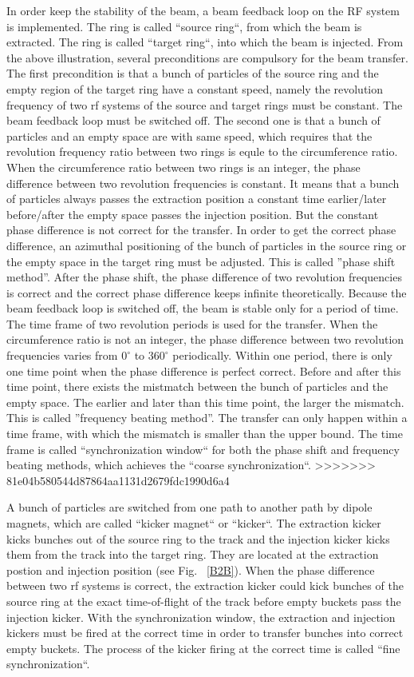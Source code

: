 In order keep the stability of the beam, a beam feedback loop on the RF system is implemented. The ring is called ``source ring``, from which the beam is extracted. The ring is called ``target ring``, into which the beam is injected. From the above illustration, several preconditions are compulsory for the beam transfer. The first precondition is that a bunch of particles of the source ring and the empty region of the target ring have a constant speed, namely the revolution frequency of two rf systems of the source and target rings must be constant. The beam feedback loop must be switched off. The second one is that a bunch of particles and an empty space are with same speed, which requires that the revolution frequency ratio between two rings is equle to the circumference ratio. When the circumference ratio between two rings is an integer, the phase difference between two revolution frequencies is constant. It means that a bunch of particles always passes the extraction position a constant time earlier/later before/after the empty space passes the injection position. But the constant phase difference is not correct for the transfer. In order to get the correct phase difference, an azimuthal positioning of the bunch of particles in the source ring or the empty space in the target ring must be adjusted. This is called  ''phase shift method''. After the phase shift, the phase difference of two revolution frequencies is correct and the correct phase difference keeps infinite theoretically. Because the beam feedback loop is switched off, the beam is stable only for a period of time. The time frame of two revolution periods is used for the transfer. When the circumference ratio is not an integer, the phase difference between two revolution frequencies varies from $0^\circ$ to $360^\circ$ periodically. Within one period, there is only one time point when the phase difference is perfect correct. Before and after this time point, there exists the mistmatch between the bunch of particles and the empty space. The earlier and later than this time point, the larger the mismatch. This is called ''frequency beating method''. The transfer can only happen within a time frame, with which the mismatch is smaller than the upper bound. The time frame is called ``synchronization window`` for both the phase shift and frequency beating methods, which achieves the ``coarse synchronization``.
>>>>>>> 81e04b580544d87864aa1131d2679fdc1990d6a4

A bunch of particles are switched from one path to another path by dipole magnets, which are called ``kicker magnet`` or ``kicker``. The extraction kicker kicks bunches out of the source ring to the track and the injection kicker kicks them from the track into the target ring. They are located at the extraction postion and injection position (see Fig. ~\ref{B2B}). When the phase difference between two rf systems is correct, the extraction kicker could kick bunches of the source ring at the exact time-of-flight of the track before empty buckets pass the injection kicker. With the synchronization window, the extraction and injection kickers must be fired at the correct time in order to transfer bunches into correct empty buckets. The process of the kicker firing at the correct time is called ``fine synchronization``.

